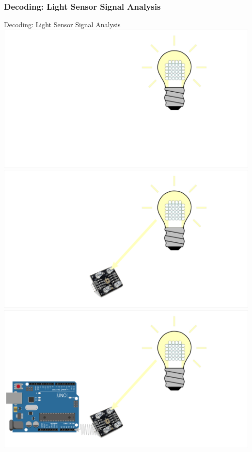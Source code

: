 \documentclass[11pt,t,usepdftitle=false,aspectratio=169]{beamer}
\begin{document}
\subsubsection{Decoding: Light Sensor Signal Analysis}%
\label{sub:decoding_light_sensor_signal_analysis}
\begin{frame}{Decoding: Light Sensor Signal Analysis}
     {
        \centering
        \includegraphics{img/Decoding_1.png}
    }
     {
        \centering
        \includegraphics{img/Decoding_2.png}
    }
     {
        \centering
        \includegraphics{img/Decoding_3.png}
}
\end{frame}
\end{document}
